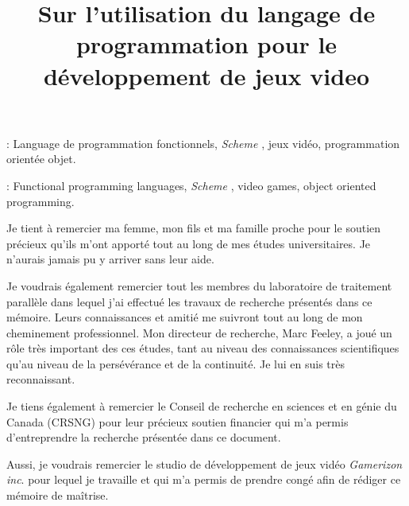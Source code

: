 \documentclass[12pt,twoside,letterpaper,francais]{book}
\title{Sur l'utilisation du langage de programmation \Schemelang pour
  le développement de jeux video}
\newcommand{\Schemelang}{{\textit{Scheme }}}
\begin{document}
\setcounter{page}{1}
\PagesCouverture

\setlength\textheight{9.0in}
\setlength\headsep{20pt}
\setlength\headheight{0in}
\setlength\topmargin{0in}
\addtolength{\voffset}{-0.5in}
\doublespacing

\resume


\vspace{2em}

: Language de programmation fonctionnels,
\Schemelang, jeux vidéo, programmation orientée objet.

\abstract



\vspace{2em}

: Functional programming languages, \Schemelang,
video games, object oriented programming.



 
\tabledesmatieres

\listedestableaux

\listedesfigures


\remerciements

Je tient à remercier ma femme, mon fils et ma famille proche pour le
soutien précieux qu'ils m'ont apporté tout au long de mes études
universitaires. Je n'aurais jamais pu y arriver sans leur aide.

Je voudrais également remercier tout les membres du laboratoire de
traitement parallèle dans lequel j'ai effectué les travaux de
recherche présentés dans ce mémoire. Leurs connaissances et amitié me
suivront tout au long de mon cheminement professionnel. Mon directeur
de recherche, Marc Feeley, a joué un rôle très important des ces
études, tant au niveau des connaissances scientifiques qu'au niveau de
la persévérance et de la continuité. Je lui en suis très
reconnaissant. 

Je tiens également à remercier le Conseil de recherche en sciences et
en génie du Canada (CRSNG) pour leur précieux soutien financier qui
m'a permis d'entreprendre la recherche présentée dans ce document.

Aussi, je voudrais remercier le studio de développement de jeux vidéo
\textit{Gamerizon inc}. pour lequel je travaille et qui m'a permis de
prendre congé afin de rédiger ce mémoire de maîtrise.
\end{document}
